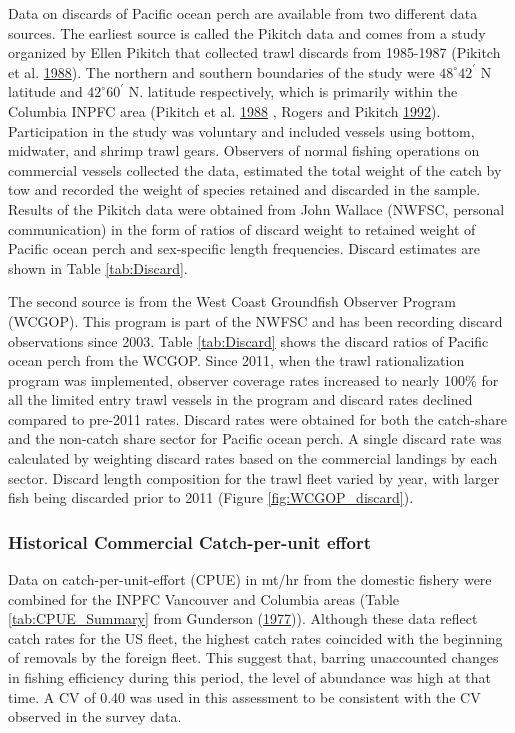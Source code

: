 \documentclass[12pt,]{article}
\begin{document}
Data on discards of Pacific ocean perch are available from two different
data sources. The earliest source is called the Pikitch data and comes
from a study organized by Ellen Pikitch that collected trawl discards
from 1985-1987 (Pikitch et al.
\protect\hyperlink{ref-pikitch_evaluation_1988}{1988}). The northern and
southern boundaries of the study were \(48^\circ 42^\prime\) N latitude
and \(42^\circ 60^\prime\) N. latitude respectively, which is primarily
within the Columbia INPFC area (Pikitch et al.
\protect\hyperlink{ref-pikitch_evaluation_1988}{1988} , Rogers and
Pikitch \protect\hyperlink{ref-rogers_numerical_1992}{1992}).
Participation in the study was voluntary and included vessels using
bottom, midwater, and shrimp trawl gears. Observers of normal fishing
operations on commercial vessels collected the data, estimated the total
weight of the catch by tow and recorded the weight of species retained
and discarded in the sample. Results of the Pikitch data were obtained
from John Wallace (NWFSC, personal communication) in the form of ratios
of discard weight to retained weight of Pacific ocean perch and
sex-specific length frequencies. Discard estimates are shown in Table
\ref{tab:Discard}.

The second source is from the West Coast Groundfish Observer Program
(WCGOP). This program is part of the NWFSC and has been recording
discard observations since 2003. Table \ref{tab:Discard} shows the
discard ratios of Pacific ocean perch from the WCGOP. Since 2011, when
the trawl rationalization program was implemented, observer coverage
rates increased to nearly 100\% for all the limited entry trawl vessels
in the program and discard rates declined compared to pre-2011 rates.
Discard rates were obtained for both the catch-share and the non-catch
share sector for Pacific ocean perch. A single discard rate was
calculated by weighting discard rates based on the commercial landings
by each sector. Discard length composition for the trawl fleet varied by
year, with larger fish being discarded prior to 2011 (Figure
\ref{fig:WCGOP_discard}).

\subsubsection{Historical Commercial Catch-per-unit
effort}\label{historical-commercial-catch-per-unit-effort}

Data on catch-per-unit-effort (CPUE) in mt/hr from the domestic fishery
were combined for the INPFC Vancouver and Columbia areas (Table
\ref{tab:CPUE_Summary} from Gunderson
(\protect\hyperlink{ref-gunderson_population_1977}{1977})). Although
these data reflect catch rates for the US fleet, the highest catch rates
coincided with the beginning of removals by the foreign fleet. This
suggest that, barring unaccounted changes in fishing efficiency during
this period, the level of abundance was high at that time. A CV of 0.40
was used in this assessment to be consistent with the CV observed in the
survey data.
\end{document}
